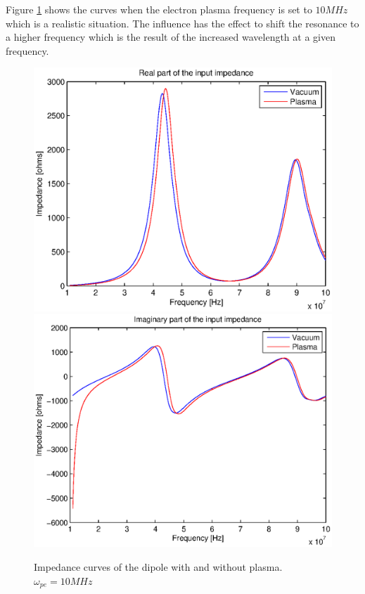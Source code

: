 \documentclass[a4paper,11pt]{thesis}
\begin{document}
Figure \ref{fig:imps_10MHz} shows the curves when the electron plasma frequency is set to $10MHz$ which is a realistic situation. The influence has the effect to shift the resonance to a higher frequency which is the result of the increased wavelength at a given frequency.

\begin{figure}
\begin{center}
 \includegraphics[width=11.5cm]{DissPics/impedance_dipole_fixed_abs.eps}
\includegraphics[width=11.5cm]{DissPics/impedance_dipole_fixed_abs_imag.eps}
 \caption{Impedance curves of the dipole with and without plasma. $\omega_{pe}=10MHz$ }\label{fig:imps_10MHz}
 \end{center}
\end{figure}
\end{document}
